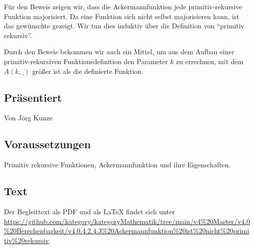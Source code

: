 \documentclass[a4paper]{amsart}
\theoremstyle{definition}
\begin{document}
Für den Beweis zeigen wir, dass die Ackermannfunktion jede primitiv-rekursive Funktion majorisiert. Da
eine Funktion sich nicht selbst majorisieren kann, ist das gewünschte gezeigt. Wir tun dies induktiv
über die Definition von "`primitiv rekursiv"'.

Durch den Beweis bekommen wir auch ein Mittel, um aus dem Aufbau einer primitiv-rekursiven Funktionsdefinition
den Parameter $k$ zu errechnen, mit dem $A( k, \_ )$ größer ist als die definierte Funktion.

\subsection*{Präsentiert}
Von Jörg Kunze

\subsection*{Voraussetzungen}
Primitiv rekursive Funktionen, Ackermannfunktion und ihre Eigenschaften.

\subsection*{Text}
Der Begleittext als PDF und als LaTeX findet sich unter
\url{https://github.com/kategory/kategoryMathematik/tree/main/v4%20Master/v4.0%20Berechenbarkeit/v4.0.4.2.4.3%20Ackermannfunktion%20ist%20nicht%20primitiv%20rekursiv}.

\end{document}
